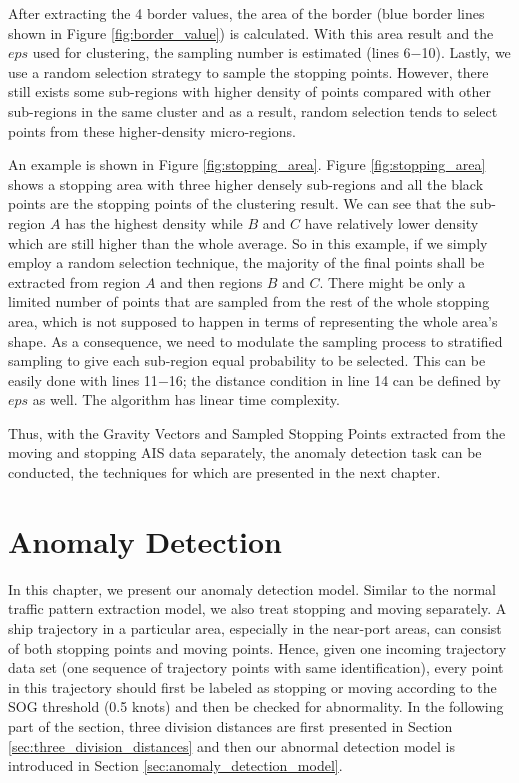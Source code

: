 \documentclass[12pt,glossary]{dalcsthesis}
\begin{document}
After extracting the 4 border values, the area of the border (blue border lines shown in Figure \ref{fig:border_value}) is calculated. With this area result and the $eps$ used for clustering, the sampling number is estimated (lines 6$-$10). Lastly, we use a random selection strategy to sample the stopping points. However, there still exists some sub-regions with higher density of points compared with other sub-regions in the same cluster and as a result,  random selection tends to select points from these higher-density micro-regions. 

An example is shown in Figure \ref{fig:stopping_area}. Figure \ref{fig:stopping_area} shows a stopping area with three higher densely sub-regions and all the black points are the stopping points of the clustering result. We can see that the sub-region $A$ has the highest density while $B$ and $C$ have relatively lower density which are still higher than the whole average. So in this example, if we simply employ a random selection technique, the majority of the final points shall be extracted from region $A$ and then regions $B$ and $C$. There might be only a limited number of points that are sampled from the rest of the whole stopping area, which is not supposed to happen in terms of representing the whole area's shape.  As a consequence, we need to modulate the  sampling process to stratified sampling to give each sub-region equal probability to be selected. This can be easily done with lines 11$-$16; the distance condition in line 14 can be defined by $eps$ as well. The algorithm has linear time complexity.

Thus, with the Gravity Vectors and Sampled Stopping Points extracted from the moving and stopping AIS data separately, the anomaly detection task can be conducted, the techniques for which are presented in the next chapter.



\chapter{Anomaly Detection}
\label{ch:anomaly_detection}

In this chapter, we present our anomaly detection model. Similar to the normal traffic pattern extraction model, we also treat stopping and moving separately. A ship trajectory in a particular area, especially in the near-port areas, can consist of both stopping points and moving points. Hence, given one incoming trajectory data set (one sequence of trajectory points with same identification), every point in this trajectory should first be labeled as stopping or moving according to the SOG threshold (0.5 knots) and then be checked for abnormality.  In the following part of the section, three division distances are first presented in Section \ref{sec:three_division_distances} and then our abnormal detection model is introduced in Section \ref{sec:anomaly_detection_model}.
\end{document}
